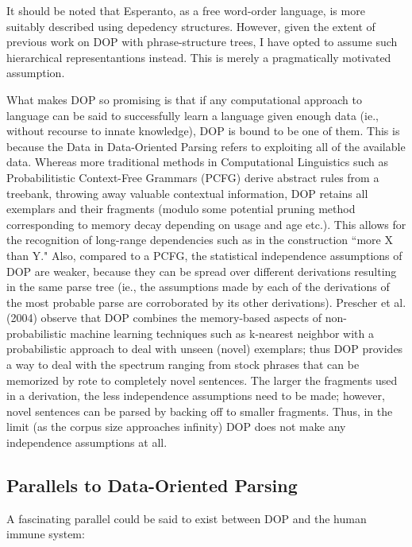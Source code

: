 \documentclass[10pt,a4paper]{article}
\begin{document}
It should be noted that Esperanto, as a free word-order language, is more
suitably described using depedency structures. However, given the extent of
previous work on DOP with phrase-structure trees, I have opted to assume such
hierarchical representantions instead. This is merely a pragmatically motivated
assumption. 

What makes DOP so promising is that if any computational approach to language
can be said to successfully learn a language given enough data (ie., without
recourse to innate knowledge), DOP is bound to be one of them.  This is because
the Data in Data-Oriented Parsing refers to exploiting all of the available
data. Whereas more traditional methods in Computational Linguistics such as
Probabilitistic Context-Free Grammars (PCFG) derive abstract rules from a
treebank, throwing away valuable contextual information, DOP retains all
exemplars and their fragments (modulo some potential pruning method
corresponding to memory decay depending on usage and age etc.). This allows for
the recognition of long-range dependencies such as in the construction ``more X
than Y." Also, compared to a PCFG, the statistical independence assumptions of
DOP are weaker, because they can be spread over different derivations
resulting in the same parse tree (ie., the assumptions made by each of the
derivations of the most probable parse are corroborated by its other
derivations). Prescher et al. (2004) observe that DOP combines the memory-based
aspects of non-probabilistic machine learning techniques such as k-nearest
neighbor with a probabilistic approach to deal with unseen (novel) exemplars;
thus DOP provides a way to deal with the spectrum ranging from stock phrases
that can be memorized by rote to completely novel sentences. The larger the
fragments used in a derivation, the less independence assumptions need to be
made; however, novel sentences can be parsed by backing off to smaller
fragments. Thus, in the limit (as the corpus size approaches infinity) DOP does
not make any independence assumptions at all. 

\subsection{Parallels to Data-Oriented Parsing}

A fascinating parallel could be said to exist between DOP and the human immune
system:
\end{document}
